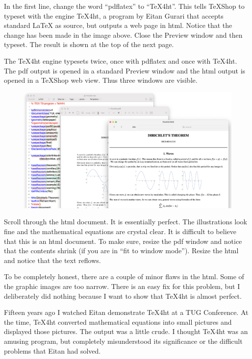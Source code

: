 \documentclass[11pt, oneside]{article}   	%
\begin{document}
In the first line, change the word ``pdflatex'' to ``TeX4ht''. This tells TeXShop to typeset with the engine TeX4ht, a program by Eitan Gurari that accepts standard LaTeX as source, but outputs a web page in html. Notice that the change has been made in the image above. Close the Preview window and then typeset. The result is shown at the top of the next page.

The TeX4ht engine typesets twice, once with pdflatex and once with TeX4ht. The pdf output is opened in a standard Preview window and the html output is opened in a TeXShop web view. Thus three windows are visible.

\newpage

\begin{figure}[htbp] %
     \includegraphics[width=6.8in.]{Graphics/shot2.png} %
   \label{fig:example}
\end{figure}

Scroll through the html document. It is essentially perfect. The illustrations look fine and the mathematical equations are crystal clear. It is difficult to believe that this is an html document. To make sure, resize the pdf window and notice that the contents shrink (if you are in ``fit to window mode''). Resize the html and notice that the text reflows.

To be completely honest, there are a couple of  minor flaws in the html. Some of the graphic images are too narrow. There is an easy fix for this problem, but I deliberately did nothing because I want to show that TeX4ht is almost perfect. 

Fifteen years ago I watched Eitan demonstrate TeX4ht at a TUG Conference. At the time, TeX4ht converted mathematical equations into small pictures and displayed those pictures. The output was a little crude. I thought TeX4ht was an amusing program, but completely misunderstood its significance or the difficult problems that Eitan had solved. 
\end{document}
